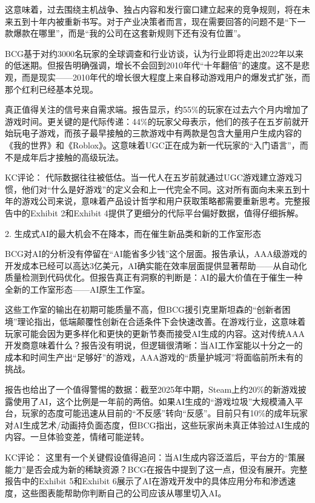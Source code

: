 \documentclass[11pt]{ctexart}
\begin{document}
这意味着，过去围绕主机战争、独占内容和发行窗口建立起来的竞争规则，将在未来五到十年内被重新书写。对于产业决策者而言，现在需要回答的问题不是“下一款爆款在哪里”，而是“我的公司在这套新规则下还有没有位置”。

BCG基于对约3000名玩家的全球调查和行业访谈，认为行业即将走出2022年以来的低迷期。但报告明确强调，增长不会回到2010年代“十年翻倍”的速度。这不是悲观，而是现实——2010年代的增长很大程度上来自移动游戏用户的爆发式扩张，而那个红利已经基本兑现。

真正值得关注的信号来自需求端。报告显示，约55\%的玩家在过去六个月内增加了游戏时间。更关键的是代际传递：44\%的玩家父母表示，他们的孩子在五岁前就开始玩电子游戏，而孩子最早接触的三款游戏中有两款是包含大量用户生成内容的《我的世界》和《Roblox》。这意味着UGC正在成为新一代玩家的“入门语言”，而不是成年后才接触的高级玩法。

KC评论： 代际数据往往被低估。当一代人在五岁前就通过UGC游戏建立游戏习惯，他们对“什么是好游戏”的定义会和上一代完全不同。这对所有面向未来五到十年的游戏公司来说，意味着产品设计哲学和用户获取策略都需要重新思考。完整报告中的Exhibit 2和Exhibit 4提供了更细分的代际平台偏好数据，值得仔细拆解。

2. 生成式AI的最大机会不在降本，而在催生新品类和新的工作室形态

BCG对AI的分析没有停留在“AI能省多少钱”这个层面。报告承认，AAA级游戏的开发成本已经可以高达3亿美元，AI确实能在效率层面提供显著帮助——从自动化质量检测到代码优化。但报告真正有洞察的判断是：AI的最大价值在于催生一种全新的工作室形态——AI原生工作室。

这些工作室的输出在初期可能质量不高，但BCG援引克里斯坦森的“创新者困境”理论指出，低端颠覆性创新在合适条件下会快速改善。在游戏行业，这意味着玩家可能会因为更多样化和更快的更新节奏而接受AI生成的内容。这对传统AAA开发商意味着什么？报告没有明说，但逻辑很清晰：当AI工作室能以十分之一的成本和时间生产出“足够好”的游戏，AAA游戏的“质量护城河”将面临前所未有的挑战。

报告也给出了一个值得警惕的数据：截至2025年中期，Steam上约20\%的新游戏披露使用了AI，这个比例是一年前的两倍。如果AI生成的“游戏垃圾”大规模涌入平台，玩家的态度可能迅速从目前的“不反感”转向“反感”。目前只有10\%的成年玩家对AI生成艺术/动画持负面态度，但BCG指出，这些玩家尚未真正体验过AI生成的内容。一旦体验变差，情绪可能逆转。

KC评论： 这里有一个关键假设值得追问：当AI生成内容泛滥后，平台方的“策展能力”是否会成为新的稀缺资源？BCG在报告中提到了这一点，但没有展开。完整报告中的Exhibit 5和Exhibit 6展示了AI在游戏开发中的具体应用分布和渗透速度，这些图表能帮助你判断自己的公司应该从哪里切入AI。
\end{document}
